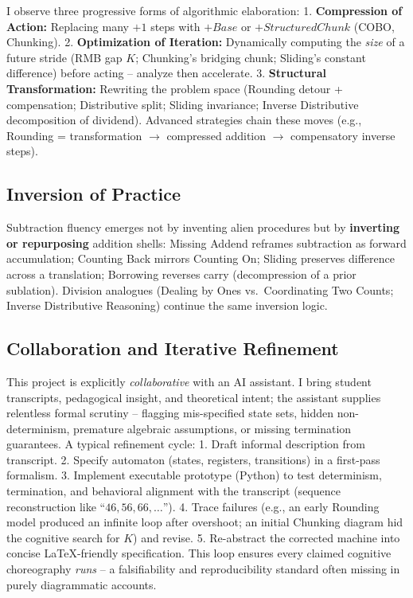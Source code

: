 \documentclass[12pt]{book}
\begin{document}
I observe three progressive forms of algorithmic elaboration: 1.
\textbf{Compression of Action:} Replacing many \(+1\) steps with
\(+Base\) or \(+StructuredChunk\) (COBO, Chunking). 2.
\textbf{Optimization of Iteration:} Dynamically computing the
\emph{size} of a future stride (RMB gap \(K\); Chunking's bridging
chunk; Sliding's constant difference) before acting -- analyze then
accelerate. 3. \textbf{Structural Transformation:} Rewriting the problem
space (Rounding detour + compensation; Distributive split; Sliding
invariance; Inverse Distributive decomposition of dividend). Advanced
strategies chain these moves (e.g., Rounding = transformation \(\to\)
compressed addition \(\to\) compensatory inverse steps).

\subsection{Inversion of Practice}\label{inversion-of-practice}

Subtraction fluency emerges not by inventing alien procedures but by
\textbf{inverting or repurposing} addition shells: Missing Addend
reframes subtraction as forward accumulation; Counting Back mirrors
Counting On; Sliding preserves difference across a translation;
Borrowing reverses carry (decompression of a prior sublation). Division
analogues (Dealing by Ones vs.~Coordinating Two Counts; Inverse
Distributive Reasoning) continue the same inversion logic.

\subsection{Collaboration and Iterative
Refinement}\label{collaboration-and-iterative-refinement}

This project is explicitly \emph{collaborative} with an AI assistant. I
bring student transcripts, pedagogical insight, and theoretical intent;
the assistant supplies relentless formal scrutiny -- flagging
mis-specified state sets, hidden non-determinism, premature algebraic
assumptions, or missing termination guarantees. A typical refinement
cycle: 1. Draft informal description from transcript. 2. Specify
automaton (states, registers, transitions) in a first-pass formalism. 3.
Implement executable prototype (Python) to test determinism,
termination, and behavioral alignment with the transcript (sequence
reconstruction like ``\(46, 56, 66, \dots\)''). 4. Trace failures (e.g.,
an early Rounding model produced an infinite loop after overshoot; an
initial Chunking diagram hid the cognitive search for \(K\)) and revise.
5. Re-abstract the corrected machine into concise LaTeX-friendly
specification. This loop ensures every claimed cognitive choreography
\emph{runs} -- a falsifiability and reproducibility standard often
missing in purely diagrammatic accounts.
\end{document}
